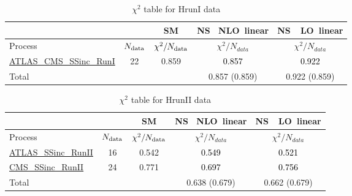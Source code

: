 \documentclass{article}
\begin{document}
\begin{table}[H]
\centering
\begin{tabular}{|l|c|c|c|c|}
\hline
 \multicolumn{2}{|c|}{} & SM& \rm NS \ NLO\ linear& \rm NS\ \ LO\ linear\\ \hline
Process & $N_{\rm data}$ & $\chi^ 2/N_{\rm data}$& $\chi^ 2/N_{data}$& $\chi^ 2/N_{data}$\\ \hline
\href{https://arxiv.org/abs/1606.02266}{ATLAS_CMS_SSinc_RunI} & 22 & 0.859 & \textcolor{black}                            {0.857} & \textcolor{black}                            {0.922} \\ \hline
\hline Total & &  & 0.857 (0.859) & 0.922 (0.859) \\ \hline
\end{tabular}
\caption{$\chi^2$ table for HrunI data}
\end{table}
\begin{table}[H]
\centering
\begin{tabular}{|l|c|c|c|c|}
\hline
 \multicolumn{2}{|c|}{} & SM& \rm NS \ NLO\ linear& \rm NS\ \ LO\ linear\\ \hline
Process & $N_{\rm data}$ & $\chi^ 2/N_{\rm data}$& $\chi^ 2/N_{data}$& $\chi^ 2/N_{data}$\\ \hline
\href{https://arxiv.org/abs/1909.02845}{ATLAS_SSinc_RunII} & 16 & 0.542 & \textcolor{black}                            {0.549} & \textcolor{black}                            {0.521} \\ \hline
\href{https://arxiv.org/abs/1809.10733}{CMS_SSinc_RunII} & 24 & 0.771 & \textcolor{black}                            {0.697} & \textcolor{black}                            {0.756} \\ \hline
\hline Total & &  & 0.638 (0.679) & 0.662 (0.679) \\ \hline
\end{tabular}
\caption{$\chi^2$ table for HrunII data}
\end{table}
\end{document}
